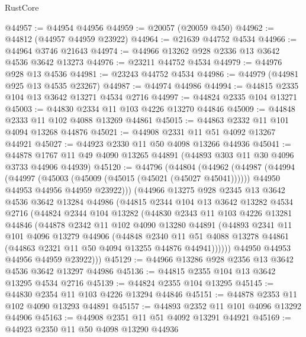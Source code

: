 \begin{lexlean}{RustCore}
\begin{coremodule}
@44957 := @44954 @44956
@44959 := @20057 (@20059 @450)
@44962 := @44812 (@44957 @44959 @23922)
@44964 := @21639 @44752 @4534
@44966 := @44964 @3746 @21643
@44974 := @44966 @13262 @928 @2336 @13 @3642 @4536 @3642 @13273
@44976 := @23211 @44752 @4534
@44979 := @44976 @928 @13 @4536
@44981 := @23243 @44752 @4534
@44986 := @44979 (@44981 @925 @13 @4535 @23267)
@44987 := @44974 @44986
@44994 := @44815 @2335 @104 @13 @3642 @13271 @4534 @2716
@44997 := @44824 @2335 @104 @13271
@45003 := @44830 @2334 @11 @103 @4226 @13270 @44846
@45009 := @44848 @2333 @11 @102 @4088 @13269 @44861
@45015 := @44863 @2332 @11 @101 @4094 @13268 @44876
@45021 := @44908 @2331 @11 @51 @4092 @13267 @44921
@45027 := @44923 @2330 @11 @50 @4098 @13266 @44936
@45041 := @44878 @1767 @11 @49 @4090 @13265 @44891 (@44893 @303 @11 @30 @4096 @3733 @44906 @44939)
@45120 := @44796
    (@44804
      (@44962
        (@44987
          (@44994
            (@44997 (@45003 (@45009 (@45015 (@45021 (@45027 @45041))))))
            @44950
            @44953
            @44956
            @44959
            @23922)))
      (@44966
        @13275
        @928
        @2345
        @13
        @3642
        @4536
        @3642
        @13284
        @44986
        (@44815
          @2344
          @104
          @13
          @3642
          @13282
          @4534
          @2716
          (@44824
            @2344
            @104
            @13282
            (@44830
              @2343
              @11
              @103
              @4226
              @13281
              @44846
              (@44878
                @2342
                @11
                @102
                @4090
                @13280
                @44891
                (@44893
                  @2341
                  @11
                  @101
                  @4096
                  @13279
                  @44906
                  (@44848
                    @2340
                    @11
                    @51
                    @4088
                    @13278
                    @44861
                    (@44863 @2321 @11 @50 @4094 @13255 @44876 @44941))))))
          @44950
          @44953
          @44956
          @44959
          @23922)))
@45129 := @44966 @13286 @928 @2356 @13 @3642 @4536 @3642 @13297 @44986
@45136 := @44815 @2355 @104 @13 @3642 @13295 @4534 @2716
@45139 := @44824 @2355 @104 @13295
@45145 := @44830 @2354 @11 @103 @4226 @13294 @44846
@45151 := @44878 @2353 @11 @102 @4090 @13293 @44891
@45157 := @44893 @2352 @11 @101 @4096 @13292 @44906
@45163 := @44908 @2351 @11 @51 @4092 @13291 @44921
@45169 := @44923 @2350 @11 @50 @4098 @13290 @44936

\end{coremodule}
\end{lexlean}
